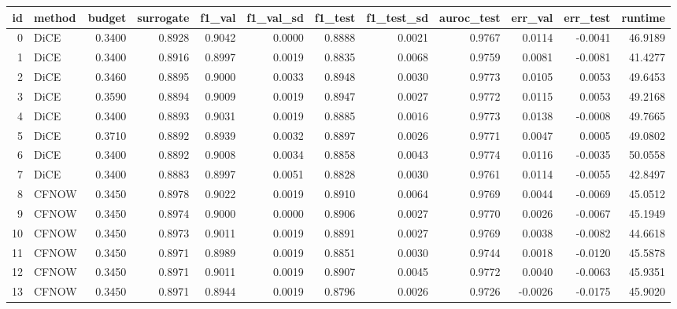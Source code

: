 \begin{tabular}{rlrrrrrrrrrr}
\toprule
 id & method &  budget &  surrogate &  f1\_val &  f1\_val\_sd &  f1\_test &  f1\_test\_sd &  auroc\_test &  err\_val &  err\_test &  runtime \\
\midrule
  0 &   DiCE &  0.3400 &     0.8928 &  0.9042 &     0.0000 &   0.8888 &      0.0021 &      0.9767 &   0.0114 &   -0.0041 &  46.9189 \\
  1 &   DiCE &  0.3400 &     0.8916 &  0.8997 &     0.0019 &   0.8835 &      0.0068 &      0.9759 &   0.0081 &   -0.0081 &  41.4277 \\
  2 &   DiCE &  0.3460 &     0.8895 &  0.9000 &     0.0033 &   0.8948 &      0.0030 &      0.9773 &   0.0105 &    0.0053 &  49.6453 \\
  3 &   DiCE &  0.3590 &     0.8894 &  0.9009 &     0.0019 &   0.8947 &      0.0027 &      0.9772 &   0.0115 &    0.0053 &  49.2168 \\
  4 &   DiCE &  0.3400 &     0.8893 &  0.9031 &     0.0019 &   0.8885 &      0.0016 &      0.9773 &   0.0138 &   -0.0008 &  49.7665 \\
  5 &   DiCE &  0.3710 &     0.8892 &  0.8939 &     0.0032 &   0.8897 &      0.0026 &      0.9771 &   0.0047 &    0.0005 &  49.0802 \\
  6 &   DiCE &  0.3400 &     0.8892 &  0.9008 &     0.0034 &   0.8858 &      0.0043 &      0.9774 &   0.0116 &   -0.0035 &  50.0558 \\
  7 &   DiCE &  0.3400 &     0.8883 &  0.8997 &     0.0051 &   0.8828 &      0.0030 &      0.9761 &   0.0114 &   -0.0055 &  42.8497 \\
  8 &  CFNOW &  0.3450 &     0.8978 &  0.9022 &     0.0019 &   0.8910 &      0.0064 &      0.9769 &   0.0044 &   -0.0069 &  45.0512 \\
  9 &  CFNOW &  0.3450 &     0.8974 &  0.9000 &     0.0000 &   0.8906 &      0.0027 &      0.9770 &   0.0026 &   -0.0067 &  45.1949 \\
 10 &  CFNOW &  0.3450 &     0.8973 &  0.9011 &     0.0019 &   0.8891 &      0.0027 &      0.9769 &   0.0038 &   -0.0082 &  44.6618 \\
 11 &  CFNOW &  0.3450 &     0.8971 &  0.8989 &     0.0019 &   0.8851 &      0.0030 &      0.9744 &   0.0018 &   -0.0120 &  45.5878 \\
 12 &  CFNOW &  0.3450 &     0.8971 &  0.9011 &     0.0019 &   0.8907 &      0.0045 &      0.9772 &   0.0040 &   -0.0063 &  45.9351 \\
 13 &  CFNOW &  0.3450 &     0.8971 &  0.8944 &     0.0019 &   0.8796 &      0.0026 &      0.9726 &  -0.0026 &   -0.0175 &  45.9020 \\

\end{tabular}
